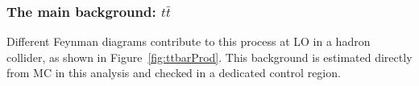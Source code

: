 \documentclass[a4paper, 10pt, openright]{report}
\begin{document}
\subsubsection{The main background: $t \bar t$} \label{subsection:ttbar}


Different Feynman diagrams contribute to this process at \ac{LO} in a hadron collider, as shown in Figure~\ref{fig:ttbarProd}. This background is estimated directly from \ac{MC} in this analysis and checked in a dedicated control region.
\end{document}
